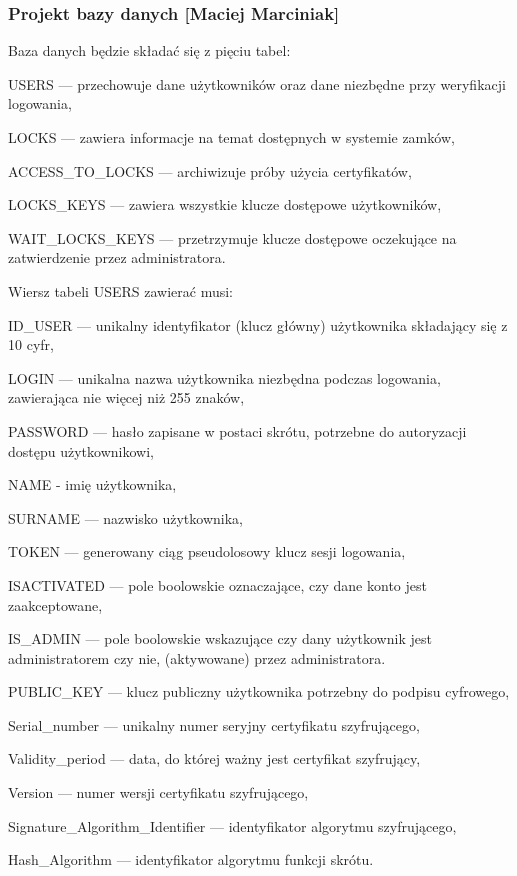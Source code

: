 \subsubsection{Projekt bazy danych [Maciej Marciniak]} 
Baza danych będzie składać się z pięciu tabel:
\begin{itemize*}
	\item {USERS} --- przechowuje dane użytkowników oraz dane niezbędne przy weryfikacji logowania,
	\item {LOCKS} --- zawiera informacje na temat dostępnych w systemie zamków,
	\item {ACCESS\_TO\_LOCKS} --- archiwizuje próby użycia certyfikatów,
	\item {LOCKS\_KEYS} --- zawiera wszystkie klucze dostępowe użytkowników,
	\item {WAIT\_LOCKS\_KEYS} --- przetrzymuje klucze dostępowe oczekujące na zatwierdzenie przez administratora.
\end{itemize*}

Wiersz tabeli USERS zawierać musi:
\begin{itemize*}
	\item {ID\_USER} --- unikalny identyfikator (klucz główny) użytkownika składający się z 10 cyfr,
	\item {LOGIN} --- unikalna nazwa użytkownika niezbędna podczas logowania, zawierająca nie więcej niż 255 znaków,
	\item {PASSWORD} --- hasło zapisane w postaci skrótu, potrzebne do autoryzacji dostępu użytkownikowi,
	\item {NAME} - imię użytkownika,
	\item {SURNAME} --- nazwisko użytkownika,
	\item {TOKEN} --- generowany ciąg pseudolosowy klucz sesji logowania,
	\item  {ISACTIVATED} --- pole boolowskie oznaczające, czy dane konto jest zaakceptowane,
	\item {IS\_ADMIN} --- pole boolowskie wskazujące czy dany użytkownik jest administratorem czy nie, (aktywowane) przez administratora.
	\item {PUBLIC\_KEY} --- klucz publiczny użytkownika potrzebny do podpisu cyfrowego,
	\item Serial\_number --- unikalny numer seryjny certyfikatu szyfrującego,
	\item Validity\_period --- data, do której ważny jest certyfikat szyfrujący,
	\item Version --- numer wersji certyfikatu szyfrującego,
	\item Signature\_Algorithm\_Identifier --- identyfikator algorytmu szyfrującego,
	\item Hash\_Algorithm --- identyfikator algorytmu funkcji skrótu.
\end{itemize*}

